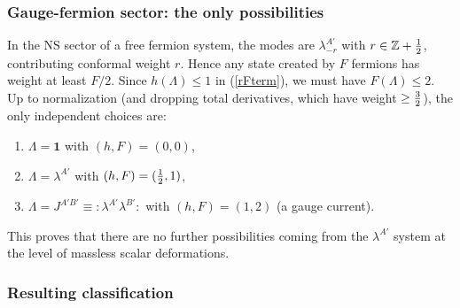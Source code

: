 \documentclass[12pt]{article}
\newcommand{\bb}[1]{\mathbb{#1}}
\begin{document}
\subsubsection*{Gauge-fermion sector: the only possibilities}

In the NS sector of a free fermion system, the modes are $\lambda^{A'}_{-r}$ with $r\in \bb{Z}+{1\over 2}$, contributing conformal weight $r$. Hence any state created by $F$ fermions has weight at least $F/2$. Since $h(\Lambda)\le 1$ in (\ref{rFterm}), we must have $F(\Lambda)\le 2$. Up to normalization (and dropping total derivatives, which have weight $\ge {3\over 2}$), the only independent choices are:
\begin{enumerate}
\item $\Lambda=\mathbf{1}$ with $(h,F)=(0,0)$,
\item $\Lambda=\lambda^{A'}$ with $(h,F)=({1\over 2},1)$,
\item $\Lambda=J^{A'B'}\equiv :\lambda^{A'}\lambda^{B'}:$ with $(h,F)=(1,2)$ (a gauge current).
\end{enumerate}
This proves that there are no further possibilities coming from the $\lambda^{A'}$ system at the level of massless scalar deformations.

\subsubsection*{Resulting classification}
\end{document}
